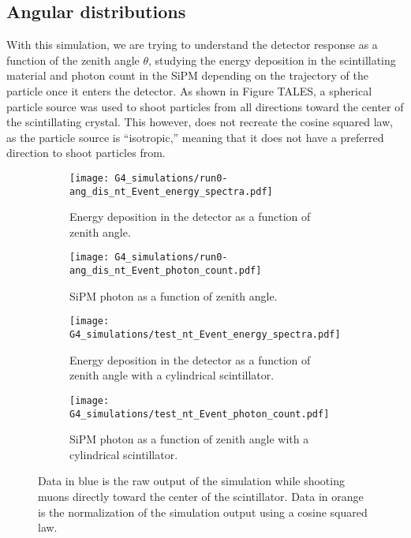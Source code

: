 \subsection{Angular distributions}\label{sec:cos_squared}

With this simulation, we are trying to understand the detector response as a function of the zenith angle $\theta$, studying the energy deposition in the scintillating material and photon count in the SiPM depending on the trajectory of the particle once it enters the detector. As shown in Figure TALES, a spherical particle source was used to shoot particles from all directions toward the center of the scintillating crystal. This however, does not recreate the cosine squared law, as the particle source is ``isotropic,'' meaning that it does not have a preferred direction to shoot particles from.

\begin{figure}[H]
  \centering
  \begin{subfigure}[t]{0.48\textwidth}
    \texttt{[image: G4\_simulations/run0-ang\_dis\_nt\_Event\_energy\_spectra.pdf]}
    \caption{\label{sfig:ang_edep}Energy deposition in the detector as a function of zenith angle.}
  \end{subfigure}
  \hfill
  \begin{subfigure}[t]{0.48\textwidth}
    \texttt{[image: G4\_simulations/run0-ang\_dis\_nt\_Event\_photon\_count.pdf]}
    \caption{\label{sfig:ang_pcount}SiPM photon as a function of zenith angle.}
  \end{subfigure}
  \medskip
  \begin{subfigure}[t]{0.48\textwidth}
    \texttt{[image: G4\_simulations/test\_nt\_Event\_energy\_spectra.pdf]}
    \caption{\label{sfig:ang_edep_cylinder}Energy deposition in the detector as a function of zenith angle with a cylindrical scintillator.}
  \end{subfigure}
  \hfill
  \begin{subfigure}[t]{0.48\textwidth}
    \texttt{[image: G4\_simulations/test\_nt\_Event\_photon\_count.pdf]}
    \caption{\label{sfig:ang_pcount_cylinder}SiPM photon as a function of zenith angle with a cylindrical scintillator.}
  \end{subfigure}
  \caption{\label{fig:ang_results}Data in blue is the raw output of the simulation while shooting muons directly toward the center of the scintillator. Data in orange is the normalization of the simulation output using a cosine squared law.}
\end{figure}

